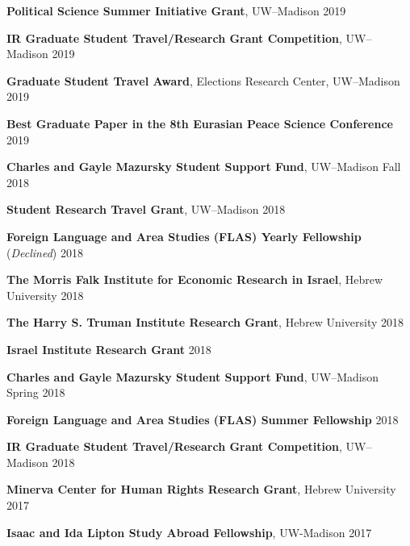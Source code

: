 \documentclass[11pt]{article}
\begin{document}
\textbf{Political Science Summer Initiative Grant}, UW--Madison \hfill 2019\vspace{.01in}

\textbf{IR Graduate Student Travel/Research Grant Competition}, UW--Madison \hfill 2019\vspace{.01in}

\textbf{Graduate Student Travel Award}, Elections Research Center, UW--Madison \hfill  2019\vspace{.01in}

\textbf{Best Graduate Paper in the 8th Eurasian Peace Science Conference} \hfill  2019\vspace{.01in}

\textbf{Charles and Gayle Mazursky Student Support Fund}, UW--Madison \hfill  Fall 2018\vspace{.01in}

\textbf{Student Research Travel Grant}, UW--Madison \hfill 2018\vspace{.01in}

\textbf{Foreign Language and Area Studies (FLAS) Yearly Fellowship} (\emph{Declined}) \hfill 2018\vspace{.01in}

\textbf{The Morris Falk Institute for Economic Research in Israel}, Hebrew University \hfill  2018\vspace{.01in}

\textbf{The Harry S. Truman Institute Research Grant}, Hebrew University \hfill  2018\vspace{.01in}

\textbf{Israel Institute Research Grant} \hfill  2018\vspace{.01in}

\textbf{Charles and Gayle Mazursky Student Support Fund}, UW--Madison \hfill  Spring 2018\vspace{.01in}

\textbf{Foreign Language and Area Studies (FLAS) Summer Fellowship} \hfill 2018\vspace{.01in}

\textbf{IR Graduate Student Travel/Research Grant Competition}, UW--Madison \hfill 2018\vspace{.01in}

\textbf{Minerva Center for Human Rights Research Grant}, Hebrew University \hfill 2017\vspace{.01in}

\textbf{Isaac and Ida Lipton Study Abroad Fellowship}, UW-Madison \hfill 2017\vspace{.01in}
\end{document}
